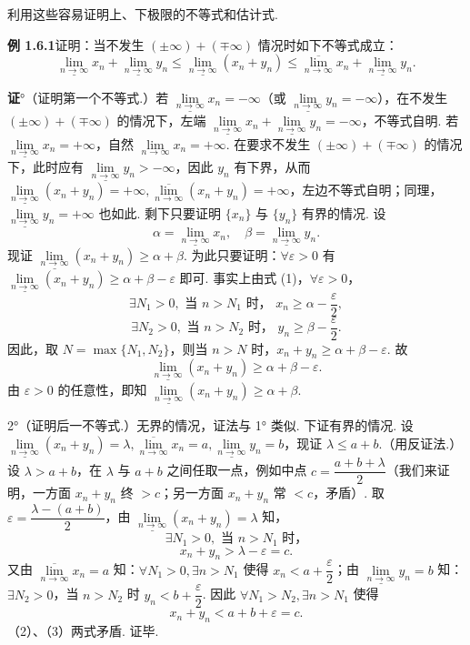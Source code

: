 \documentclass[UTF8,12pt,a4paper,fontset=fandol]{ctexart}
\begin{document}
利用这些容易证明上、下极限的不等式和估计式.

\noindent\textbf{例 1.6.1}\quad 证明：当不发生 $(\pm\infty)+(\mp\infty)$ 情况时如下不等式成立：
\[
  \underline{\lim_{n\to\infty}}x_n+\underline{\lim_{n\to\infty}}y_n
  \le \underline{\lim_{n\to\infty}}(x_n+y_n)
  \le \overline{\lim_{n\to\infty}}x_n+\underline{\lim_{n\to\infty}}y_n.
\]

\noindent\textbf{证}°（证明第一个不等式.）若 $\underline{\lim\limits_{n\to\infty}}x_n=-\infty$（或 $\underline{\lim\limits_{n\to\infty}}y_n=-\infty$），在不发生 $(\pm\infty)+(\mp\infty)$ 的情况下，左端 $\underline{\lim\limits_{n\to\infty}}x_n+\underline{\lim\limits_{n\to\infty}}y_n=-\infty$，不等式自明. 若 $\underline{\lim\limits_{n\to\infty}}x_n=+\infty$，自然 $\lim\limits_{n\to\infty}x_n=+\infty$. 在要求不发生 $(\pm\infty)+(\mp\infty)$ 的情况下，此时应有 $\underline{\lim\limits_{n\to\infty}}y_n>-\infty$，因此 $y_n$ 有下界，从而 $\underline{\lim\limits_{n\to\infty}}(x_n+y_n)=+\infty,\overline{\lim\limits_{n\to\infty}}(x_n+y_n)=+\infty$，左边不等式自明；同理，$\underline{\lim\limits_{n\to\infty}}y_n=+\infty$ 也如此. 剩下只要证明 $\{x_n\}$ 与 $\{y_n\}$ 有界的情况. 设
\[
  \alpha=\underline{\lim_{n\to\infty}}x_n,\quad \beta=\underline{\lim_{n\to\infty}}y_n.
\tag{1}
\]
现证 $\underline{\lim\limits_{n\to\infty}}(x_n+y_n)\ge \alpha+\beta$. 为此只要证明：$\forall \varepsilon>0$ 有 $\underline{\lim\limits_{n\to\infty}}(x_n+y_n)\ge \alpha+\beta-\varepsilon$ 即可. 事实上由式 (1)，$\forall \varepsilon>0$，
\[
  \exists N_1>0,\text{ 当 }n>N_1\text{ 时， }x_n\ge \alpha-\frac{\varepsilon}{2},
\]
\[
  \exists N_2>0,\text{ 当 }n>N_2\text{ 时， }y_n\ge \beta-\frac{\varepsilon}{2}.
\]
因此，取 $N=\max\{N_1,N_2\}$，则当 $n>N$ 时，$x_n+y_n\ge \alpha+\beta-\varepsilon$. 故
\[
  \underline{\lim_{n\to\infty}}(x_n+y_n)\ge \alpha+\beta-\varepsilon.
\]
由 $\varepsilon>0$ 的任意性，即知 $\underline{\lim\limits_{n\to\infty}}(x_n+y_n)\ge \alpha+\beta$.

2°（证明后一不等式.）无界的情况，证法与 1° 类似. 下证有界的情况. 设 $\underline{\lim\limits_{n\to\infty}}(x_n+y_n)=\lambda,\overline{\lim\limits_{n\to\infty}}x_n=a,\underline{\lim\limits_{n\to\infty}}y_n=b$，现证 $\lambda\le a+b$.（用反证法.）设 $\lambda>a+b$，在 $\lambda$ 与 $a+b$ 之间任取一点，例如中点 $c=\dfrac{a+b+\lambda}{2}$（我们来证明，一方面 $x_n+y_n$ 终 $>c$；另一方面 $x_n+y_n$ 常 $<c$，矛盾）. 取 $\varepsilon=\dfrac{\lambda-(a+b)}{2}$，由 $\underline{\lim\limits_{n\to\infty}}(x_n+y_n)=\lambda$ 知，
\[
  \exists N_1>0,\text{ 当 }n>N_1\text{ 时，}
\]
\[
  x_n+y_n>\lambda-\varepsilon=c.
\tag{2}
\]
又由 $\overline{\lim\limits_{n\to\infty}}x_n=a$ 知：$\forall N_1>0,\exists n>N_1$ 使得 $x_n<a+\dfrac{\varepsilon}{2}$；由 $\underline{\lim\limits_{n\to\infty}}y_n=b$ 知：$\exists N_2>0$，当 $n>N_2$ 时 $y_n<b+\dfrac{\varepsilon}{2}$. 因此 $\forall N_1>N_2,\exists n>N_1$ 使得
\[
  x_n+y_n<a+b+\varepsilon=c.
\tag{3}
\]
（2）、（3）两式矛盾. 证毕.
\end{document}
